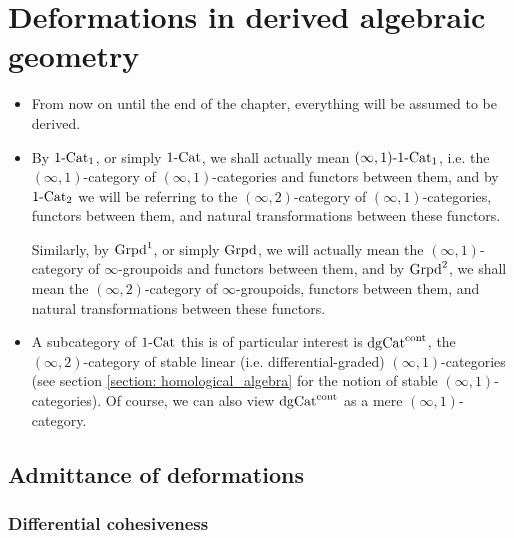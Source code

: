     \section{Deformations in derived algebraic geometry}
        \begin{convention} \label{conv: deformation_theory_everything_is_derived}
            \noindent
            \begin{itemize}
                \item From now on until the end of the chapter, everything will be assumed to be derived. 
                \item By $1\text{-}\mathrm{Cat}_1$, or simply $1\text{-}\mathrm{Cat}$, we shall actually mean $(\infty, 1)\text{-}1\text{-}\mathrm{Cat}_1$, i.e. the $(\infty, 1)$-category of $(\infty, 1)$-categories and functors between them, and by $1\text{-}\mathrm{Cat}_2$ we will be referring to the $(\infty, 2)$-category of $(\infty, 1)$-categories, functors between them, and natural transformations between these functors. 
                
                Similarly, by $\mathrm{Grpd}^1$, or simply $\mathrm{Grpd}$, we will actually mean the $(\infty, 1)$-category of $\infty$-groupoids and functors between them, and by $\mathrm{Grpd}^2$, we shall mean the $(\infty, 2)$-category of $\infty$-groupoids, functors between them, and natural transformations between these functors.
                \item A subcategory of $1\text{-}\mathrm{Cat}$ this is of particular interest is $\mathrm{dg}\mathrm{Cat}^{\mathrm{cont}}$, the $(\infty, 2)$-category of stable linear (i.e. differential-graded) $(\infty, 1)$-categories (see section \ref{section: homological_algebra} for the notion of stable $(\infty, 1)$-categories). Of course, we can also view $\mathrm{dg}\mathrm{Cat}^{\mathrm{cont}}$ as a mere $(\infty, 1)$-category.
            \end{itemize}
        \end{convention}
        
        \subsection{Admittance of deformations}
            \subsubsection{Differential cohesiveness}
                
        
